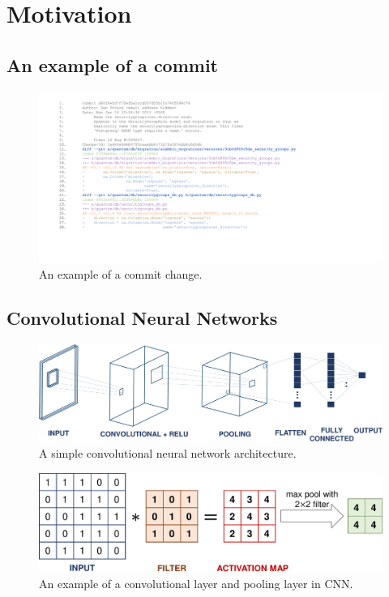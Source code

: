 
\section{Motivation}
\label{sec:motivation}



\subsection{An example of a commit }
\label{sec:examle}

\begin{figure}
\center
\includegraphics[scale=0.3]{figs/example.pdf}
\caption{An example of a commit change.}
\label{fig:example}
\end{figure}


\subsection{Convolutional Neural Networks}
\label{sec:background_cnn}

\begin{figure}[t!]
	\center
	\includegraphics[scale=0.3]{figs/cnn.pdf}
	\caption{A simple convolutional neural network architecture.}
	\label{fig:cnn}
\end{figure}

\begin{figure}[t!]
	\center
	\includegraphics[scale=0.3]{figs/filter_pooling.pdf}
	\caption{An example of a convolutional layer and pooling layer in CNN.}
	\label{fig:filter}
\end{figure}


